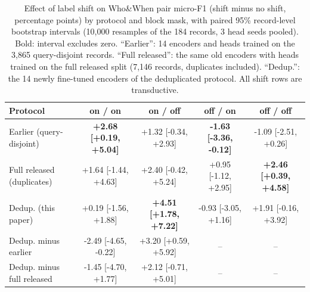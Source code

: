 \begin{table}[t]
\caption{Effect of label shift on Who\&When pair micro-F1 (shift minus no shift, percentage points) by protocol and block mask, with paired 95\% record-level bootstrap intervals (10,000 resamples of the 184 records, 3 head seeds pooled). Bold: interval excludes zero. ``Earlier'': 14 encoders and heads trained on the 3,865 query-disjoint records. ``Full released'': the same old encoders with heads trained on the full released split (7,146 records, duplicates included). ``Dedup.'': the 14 newly fine-tuned encoders of the deduplicated protocol. All shift rows are transductive.}
\label{tab:shiftgain}
\centering\footnotesize\setlength{\tabcolsep}{3pt}
\begin{tabular}{@{}lcccc@{}}
\toprule
Protocol & on / on & on / off & off / on & off / off \\
\midrule
Earlier (query-disjoint) & \textbf{+2.68 {\scriptsize[+0.19, +5.04]}} & +1.32 {\scriptsize[-0.34, +2.93]} & \textbf{-1.63 {\scriptsize[-3.36, -0.12]}} & -1.09 {\scriptsize[-2.51, +0.26]} \\
Full released (duplicates) & +1.64 {\scriptsize[-1.44, +4.63]} & +2.40 {\scriptsize[-0.42, +5.24]} & +0.95 {\scriptsize[-1.12, +2.95]} & \textbf{+2.46 {\scriptsize[+0.39, +4.58]}} \\
Dedup. (this paper) & +0.19 {\scriptsize[-1.56, +1.88]} & \textbf{+4.51 {\scriptsize[+1.78, +7.22]}} & -0.93 {\scriptsize[-3.05, +1.16]} & +1.91 {\scriptsize[-0.16, +3.92]} \\
\midrule
Dedup. minus earlier & -2.49 {\scriptsize[-4.65, -0.22]} & +3.20 {\scriptsize[+0.59, +5.92]} & -- & -- \\
Dedup. minus full released & -1.45 {\scriptsize[-4.70, +1.77]} & +2.12 {\scriptsize[-0.71, +5.01]} & -- & -- \\
\bottomrule
\end{tabular}
\end{table}
